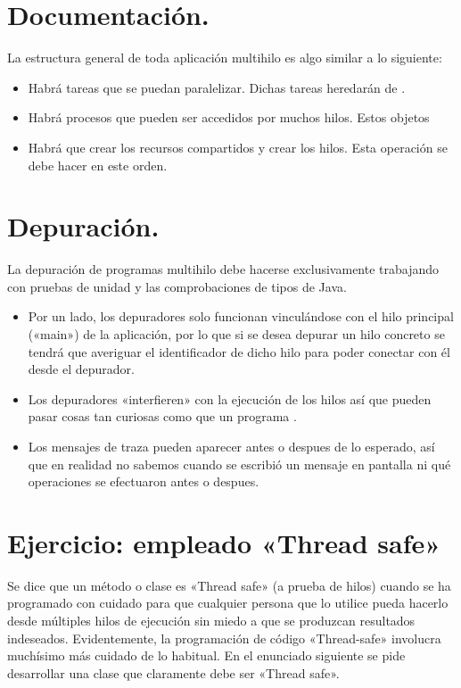 \documentclass[letterpaper,10pt,spanish]{sphinxmanual}
\begin{document}
\section{Documentación.}
\label{\detokenize{textos/tema2:documentacion}}
La estructura general de toda aplicación multihilo es algo similar a lo siguiente:
\begin{itemize}
\item {} 
Habrá tareas que se puedan paralelizar. Dichas tareas heredarán de .

\item {} 
Habrá procesos que pueden ser accedidos por muchos hilos. Estos objetos 

\item {} 
Habrá que crear los recursos compartidos y crear los hilos. Esta operación se debe hacer en este orden.

\end{itemize}


\section{Depuración.}
\label{\detokenize{textos/tema2:depuracion}}
La depuración de programas multihilo debe hacerse exclusivamente trabajando con pruebas de unidad y las comprobaciones de tipos de Java.
\begin{itemize}
\item {} 
Por un lado, los depuradores solo funcionan vinculándose con el hilo principal («main») de la aplicación, por lo que si se desea depurar un hilo concreto se tendrá que averiguar el identificador de dicho hilo para poder conectar con él desde el depurador.

\item {} 
Los depuradores «interfieren» con la ejecución de los hilos así que pueden pasar cosas tan curiosas como que un programa .

\item {} 
Los mensajes de traza pueden aparecer antes o despues de lo esperado, así que en realidad no sabemos cuando se escribió un mensaje en pantalla ni qué operaciones se efectuaron antes o despues.

\end{itemize}


\section{Ejercicio: empleado «Thread safe»}
\label{\detokenize{textos/tema2:ejercicio-empleado-thread-safe}}
Se dice que un método o clase es «Thread safe» (a prueba de hilos) cuando se ha programado con cuidado para que cualquier persona que lo utilice pueda hacerlo desde múltiples hilos de ejecución sin miedo a que se produzcan resultados indeseados. Evidentemente, la programación de código «Thread-safe» involucra muchísimo más cuidado de lo habitual. En el enunciado siguiente se pide desarrollar una clase que claramente debe ser «Thread safe».
\end{document}
